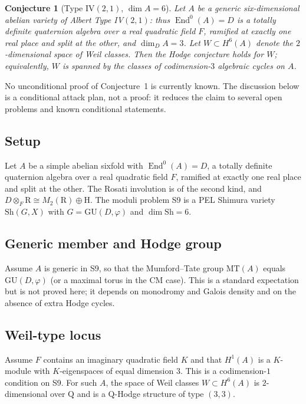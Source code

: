 \documentclass{article}
\newcommand{\mathbb}[1]{\mathrm{#1}}
\newtheorem{conjecture}{Conjecture}
\begin{document}
\begin{conjecture}[Type IV$(2,1)$, $\dim A = 6$]
Let $A$ be a generic six-dimensional abelian variety of Albert Type IV$(2,1)$: thus
$\operatorname{End}^0(A) = D$ is a totally definite quaternion algebra over a real
quadratic field $F$, ramified at exactly one real place and split at the other, and
$\dim_D A = 3$. Let $W \subset H^6(A)$ denote the $2$-dimensional space of Weil
classes. Then the Hodge conjecture holds for $W$; equivalently, $W$ is spanned by
the classes of codimension-$3$ algebraic cycles on $A$.
\end{conjecture}

No unconditional proof of Conjecture~1 is currently known. The discussion below is a
conditional attack plan, not a proof: it reduces the claim to several open problems
and known conditional statements.

\subsection*{Setup}
Let $A$ be a simple abelian sixfold with $\operatorname{End}^0(A) = D$, a totally
definite quaternion algebra over a real quadratic field $F$, ramified at exactly one
real place and split at the other. The Rosati involution is of the second kind, and
$D \otimes_F \mathbb{R} \cong M_2(\mathbb{R}) \oplus \mathbb{H}$. The moduli problem
S9 is a PEL Shimura variety $\mathrm{Sh}(G,X)$ with $G = \mathrm{GU}(D,\varphi)$ and
$\dim \mathrm{Sh} = 6$.

\subsection*{Generic member and Hodge group}
Assume $A$ is generic in S9, so that the Mumford--Tate group
$\mathrm{MT}(A)$ equals $\mathrm{GU}(D,\varphi)$ (or a maximal torus in the CM case).
This is a standard expectation but is not proved here; it depends on monodromy and
Galois density and on the absence of extra Hodge cycles.

\subsection*{Weil-type locus}
Assume $F$ contains an imaginary quadratic field $K$ and that $H^1(A)$ is a
$K$-module with $K$-eigenspaces of equal dimension $3$. This is a codimension-$1$
condition on S9. For such $A$, the space of Weil classes $W \subset H^6(A)$ is
$2$-dimensional over $\mathbb{Q}$ and is a $\mathbb{Q}$-Hodge structure of type
$(3,3)$.
\end{document}
